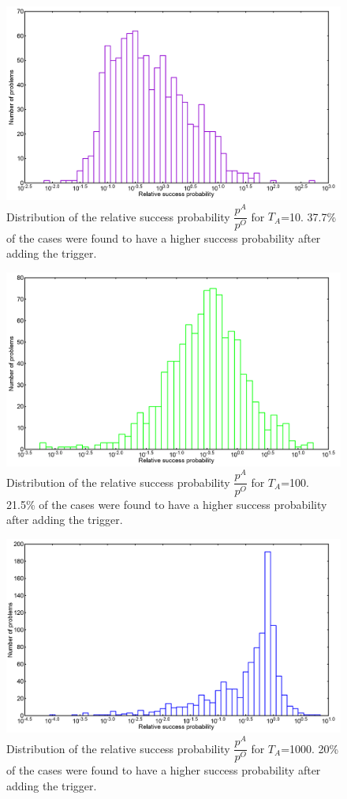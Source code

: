 \documentclass[../main.tex]{subfiles}
\begin{document}
\begin{figure}[H]
\centering 
\includegraphics[scale=0.24]{A_T10_g1.png}
\caption{Distribution of the relative success probability $\dfrac{p^A}{p^O}$ for $T_A$=10. 37.7\% of the cases were found to have a higher success probability after adding the trigger.}
\label{fig:a18}
\end{figure}
\begin{figure}[H]
\centering 
\includegraphics[scale=0.24]{A_T100_g1.png}
\caption{Distribution of the relative success probability $\dfrac{p^A}{p^O}$ for $T_A$=100. 21.5\% of the cases were found to have a higher success probability after adding the trigger. }
\label{fig:a19}
\end{figure}
\begin{figure}[H]
\centering 
\includegraphics[scale=0.24]{A_T1000_g1.png}
\caption{Distribution of the relative success probability $\dfrac{p^A}{p^O}$ for $T_A$=1000. 20\% of the cases were found to have a higher success probability after adding the trigger.}
\label{fig:a20}
\end{figure}
\end{document}
